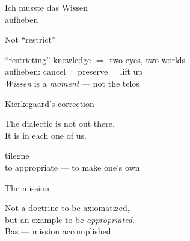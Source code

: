 \documentclass[11pt,aspectratio=169]{beamer}
\begin{document}
\begin{frame}[standout]
  Ich musste das Wissen\\ aufheben
\end{frame}

\begin{frame}{Not ``restrict''}
  \begin{center}
    ``restricting'' knowledge $\Rightarrow$ two eyes, two worlds\\[1em]
    \alert{aufheben}: cancel · preserve · lift up\\[1em]
    {\small \emph{Wissen} is a \emph{moment} --- not the telos}
  \end{center}
\end{frame}

\begin{frame}{Kierkegaard's correction}
  \begin{center}
    The dialectic is not out there.\\[1em]
    \alert{It is in each one of us.}
  \end{center}
\end{frame}

\begin{frame}[standout]
  tilegne\\
  {\normalsize to appropriate --- to make one's own}
\end{frame}

\begin{frame}{The mission}
  \begin{center}
    Not a doctrine to be axiomatized,\\
    but an example to be \emph{appropriated}.\\[1.5em]
    \large\alert{Bas --- mission accomplished.}
  \end{center}
\end{frame}
\end{document}
